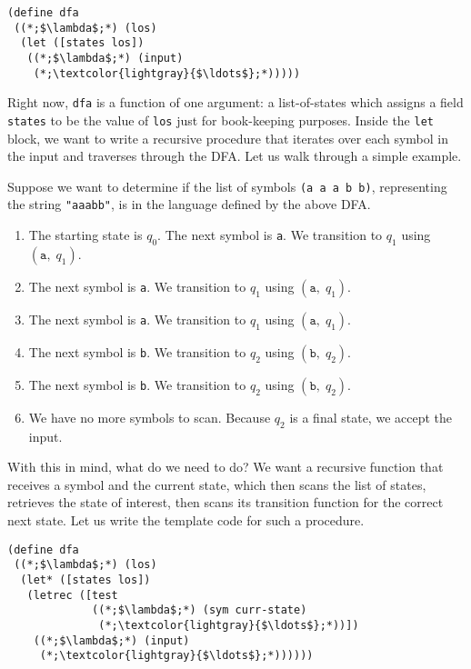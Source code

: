 \begin{cl}[]{}\begin{lstlisting}[language=MyScheme]
(define dfa
 ((*;$\lambda$;*) (los)
  (let ([states los])
   ((*;$\lambda$;*) (input)
    (*;\textcolor{lightgray}{$\ldots$};*)))))
\end{lstlisting}\end{cl}

Right now, \texttt{dfa} is a function of one argument: a list-of-states which assigns a field \texttt{states} to be the value of \texttt{los} just for book-keeping purposes. Inside the \texttt{let} block, we want to write a recursive procedure that iterates over each symbol in the input and traverses through the DFA. Let us walk through a simple example.

Suppose we want to determine if the list of symbols \texttt{\textquotesingle(a a a b b)}, representing the string \texttt{"aaabb"}, is in the language defined by the above DFA. 

\begin{enumerate}[label=(\roman*)]
    \item The starting state is $q_0$. The next symbol is \texttt{a}. We transition to $q_1$ using $(\texttt{a}, \;q_1)$.
    \item The next symbol is \texttt{a}. We transition to $q_1$ using $(\texttt{a}, \;q_1)$.
    \item The next symbol is \texttt{a}. We transition to $q_1$ using $(\texttt{a}, \;q_1)$.
    \item The next symbol is \texttt{b}. We transition to $q_2$ using $(\texttt{b}, \;q_2)$.
    \item The next symbol is \texttt{b}. We transition to $q_2$ using $(\texttt{b}, \;q_2)$.
    \item We have no more symbols to scan. Because $q_2$ is a final state, we accept the input.
\end{enumerate}

With this in mind, what do we need to do? We want a recursive function that receives a symbol and the current state, which then scans the list of states, retrieves the state of interest, then scans its transition function for the correct next state. Let us write the template code for such a procedure.

\begin{cl}[]{}\begin{lstlisting}[language=MyScheme]
(define dfa
 ((*;$\lambda$;*) (los)
  (let* ([states los])
   (letrec ([test 
             ((*;$\lambda$;*) (sym curr-state)
              (*;\textcolor{lightgray}{$\ldots$};*))])
    ((*;$\lambda$;*) (input)
     (*;\textcolor{lightgray}{$\ldots$};*))))))
\end{lstlisting}\end{cl}

